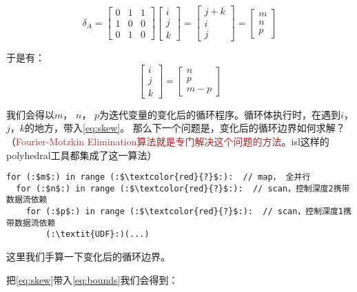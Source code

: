 \begin{equation*}
    \delta_A =
    \begin{bmatrix}
        0 & 1 & 1 \\ 1 & 0 & 0 \\ 0 & 1 & 0
    \end{bmatrix}
    \begin{bmatrix}
        i \\ j \\ k
    \end{bmatrix} =
    \begin{bmatrix}
        j+k \\ i \\ j
    \end{bmatrix} =
    \begin{bmatrix}
        m \\ n \\ p
    \end{bmatrix}
\end{equation*}

于是有：
\begin{equation}
    \begin{bmatrix}
        i \\ j \\ k
    \end{bmatrix} =
    \begin{bmatrix}
        n \\ p \\ m-p
    \end{bmatrix}\label{eq:skew}
\end{equation}

我们会得以$m$， $n$， $p$为迭代变量的变化后的循环程序。循环体执行时，在遇到$i$，$j$，$k$的地方，带入\eqref{eq:skew}。
那么下一个问题是，变化后的循环边界如何求解？（\textcolor{brown}{Fourier-Motzkin Elimination算法就是专门解决这个问题的方法}。isl这样的polyhedral工具都集成了这一算法）

\begin{lstlisting}[language=cplus]
for (:$m$:) in range (:$\textcolor{red}{?}$:):  // map， 全并行
  for (:$n$:) in range (:$\textcolor{red}{?}$:):  // scan，控制深度2携带数据流依赖
    for (:$p$:) in range (:$\textcolor{red}{?}$:):  // scan，控制深度1携带数据流依赖
        (:\textit{UDF}:)(...)
\end{lstlisting}

这里我们手算一下变化后的循环边界。

把\eqref{eq:skew}带入\eqref{eq:bounds}我们会得到：

